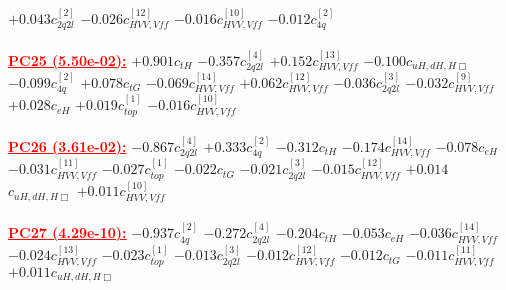 \documentclass{article}
\begin{document}
{$+0.043$}{\rm $c_{2q2l}^{[2]}$}
{$-0.026$}{\rm $c_{HVV,Vff}^{[12]}$}
{$-0.016$}{\rm $c_{HVV,Vff}^{[10]}$}
{$-0.012$}{\rm $c_{4q}^{[2]}$}
 \nonumber \\ \nonumber \\
\noindent \textcolor{red}{\underline{\bf{PC25} (5.50e-02):}}
{$+0.901$}{\rm $c_{tH}$}
{$-0.357$}{\rm $c_{2q2l}^{[4]}$}
{$+0.152$}{\rm $c_{HVV,Vff}^{[13]}$}
{$-0.100$}{\rm $c_{uH,dH,H\Box}$}
{$-0.099$}{\rm $c_{4q}^{[2]}$}
{$+0.078$}{\rm $c_{tG}$}
{$-0.069$}{\rm $c_{HVV,Vff}^{[14]}$}
{$+0.062$}{\rm $c_{HVV,Vff}^{[12]}$}
{$-0.036$}{\rm $c_{2q2l}^{[3]}$}
{$-0.032$}{\rm $c_{HVV,Vff}^{[9]}$}
{$+0.028$}{\rm $c_{eH}$}
{$+0.019$}{\rm $c_{top}^{[1]}$}
{$-0.016$}{\rm $c_{HVV,Vff}^{[10]}$}
 \nonumber \\ \nonumber \\
\noindent \textcolor{red}{\underline{\bf{PC26} (3.61e-02):}}
{$-0.867$}{\rm $c_{2q2l}^{[4]}$}
{$+0.333$}{\rm $c_{4q}^{[2]}$}
{$-0.312$}{\rm $c_{tH}$}
{$-0.174$}{\rm $c_{HVV,Vff}^{[14]}$}
{$-0.078$}{\rm $c_{eH}$}
{$-0.031$}{\rm $c_{HVV,Vff}^{[11]}$}
{$-0.027$}{\rm $c_{top}^{[1]}$}
{$-0.022$}{\rm $c_{tG}$}
{$-0.021$}{\rm $c_{2q2l}^{[3]}$}
{$-0.015$}{\rm $c_{HVV,Vff}^{[12]}$}
{$+0.014$}{\rm $c_{uH,dH,H\Box}$}
{$+0.011$}{\rm $c_{HVV,Vff}^{[10]}$}
 \nonumber \\ \nonumber \\
\noindent \textcolor{red}{\underline{\bf{PC27} (4.29e-10):}}
{$-0.937$}{\rm $c_{4q}^{[2]}$}
{$-0.272$}{\rm $c_{2q2l}^{[4]}$}
{$-0.204$}{\rm $c_{tH}$}
{$-0.053$}{\rm $c_{eH}$}
{$-0.036$}{\rm $c_{HVV,Vff}^{[14]}$}
{$-0.024$}{\rm $c_{HVV,Vff}^{[13]}$}
{$-0.023$}{\rm $c_{top}^{[1]}$}
{$-0.013$}{\rm $c_{2q2l}^{[3]}$}
{$-0.012$}{\rm $c_{HVV,Vff}^{[12]}$}
{$-0.012$}{\rm $c_{tG}$}
{$-0.011$}{\rm $c_{HVV,Vff}^{[11]}$}
{$+0.011$}{\rm $c_{uH,dH,H\Box}$}
 \nonumber \\ \nonumber \\
\end{document}

